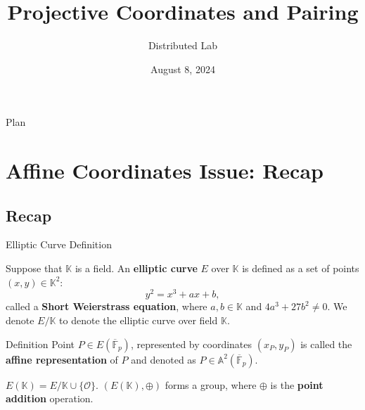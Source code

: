 \documentclass[xcolor={usenames,dvipsnames}]{beamer}
\title[Projective Space and Pairing]{\textbf{Projective Coordinates and Pairing}}
\author{Distributed Lab}
\date{August 8, 2024}
\begin{document}
	\frame {
		\titlepage
	}
 
	\begin{frame}{Plan}
        \tableofcontents
    \end{frame}

	\section{Affine Coordinates Issue: Recap}

    \subsection{Recap}
    \begin{frame}{Elliptic Curve Definition}
        \begin{definition}
            Suppose that $\mathbb{K}$ is a field. An \textbf{elliptic curve} $E$ over $\mathbb{K}$ is defined as a set of points $(x,y) \in \mathbb{K}^2$:
            \begin{equation*}
                y^2 = x^3+ax+b,
            \end{equation*}
            called a \textbf{Short Weierstrass equation}, where $a,b \in \mathbb{K}$ and $4a^3+27b^2 \neq 0$. We denote $E/\mathbb{K}$ to denote the elliptic curve over field $\mathbb{K}$.
        \end{definition}

        \begin{block}{Definition}
            Point $P \in E(\overline{\mathbb{F}}_p)$, represented by coordinates $(x_P,y_P)$ is called the \textbf{affine representation} of $P$ and denoted as $P \in \mathbb{A}^2(\overline{\mathbb{F}}_p)$.
        \end{block}

        \begin{definition}
            $E(\mathbb{K}) = E/\mathbb{K} \cup \{\mathcal{O}\}$. $(E(\mathbb{K}), \oplus)$ forms a group, where $\oplus$ is the \textbf{point addition} operation.
        \end{definition}
    \end{frame}
\end{document}
